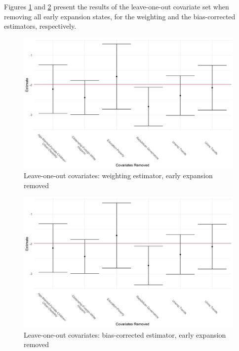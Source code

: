 \documentclass[12pt]{article}
\begin{document}
Figures \ref{eeloocovsswt} and \ref{eeloocovssdr} present the results of the leave-one-out covariate set when removing all early expansion states, for the weighting and the bias-corrected estimators, respectively.

\begin{figure}[H]
\begin{center}
    \includegraphics[scale=0.6]{images/loo-covariates-wgt-1.jpeg}
    \caption{Leave-one-out covariates: weighting estimator, early expansion removed}
    \label{eeloocovsswt}
\end{center}
\end{figure}

\begin{figure}[H]
\begin{center}
    \includegraphics[scale=0.6]{images/loo-covariates-wgt-1.jpeg}
    \caption{Leave-one-out covariates: bias-corrected estimator, early expansion removed}
    \label{eeloocovssdr}
\end{center}
\end{figure}
\end{document}
